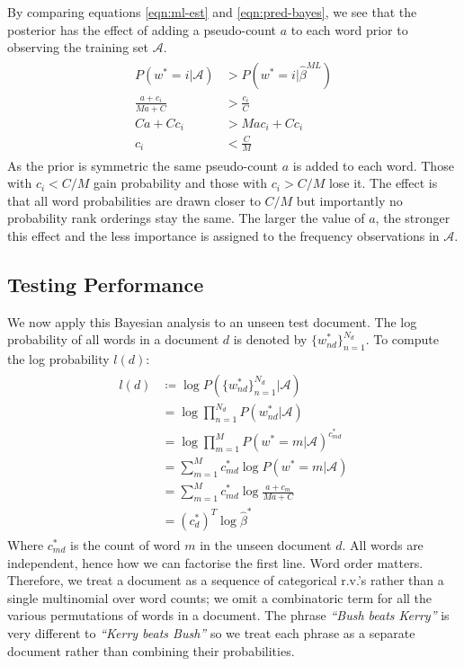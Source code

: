 \documentclass[]{article}
\newcommand{\Acal}{\mathcal{A}}
\newcommand{\betaml}{\hat{\beta}^{ML}}
\begin{document}
%
By comparing equations \ref{eqn:ml-est} and \ref{eqn:pred-bayes}, we see that the posterior has the effect of adding a pseudo-count $a$ to each word prior to observing the training set $\Acal$.
%
\begin{align}
\begin{split}
	P(w^*=i | \Acal) &> P(w^*=i | \betaml) \\
	\frac{a + c_i}{Ma + C} &> \frac{c_i}{C} \\
	Ca + Cc_i &> Mac_i + Cc_i \\
	c_i &< \frac{C}{M}
\end{split}
\end{align}
%
As the prior is symmetric the same pseudo-count $a$ is added to each word. Those with $c_i < C/M$ gain probability and those with $c_i > C/M$ lose it. The effect is that all word probabilities are drawn closer to $C/M$ but importantly no probability rank orderings stay the same. The larger the value of $a$, the stronger this effect and the less importance is assigned to the frequency observations in $\Acal$.

\subsection{Testing Performance}

We now apply this Bayesian analysis to an unseen test document. The log probability of all words in a document $d$ is denoted by $\{w^*_{nd}\}_{n=1}^{N_d}$. To compute the log probability $l(d)$:
%
\begin{align}
\begin{split}
	l(d) &\coloneqq \log P(\{w^*_{nd}\}_{n=1}^{N_d} | \Acal) \\
	&= \log \prod_{n=1}^{N_d} P(w^*_{nd} | \Acal) \\
	&= \log \prod_{m = 1}^{M} P(w^*=m | \Acal)^{c^*_{md}} \\
	&= \sum_{m=1}^{M} c^*_{md} \log P(w^* = m | \Acal) \\
	&= \sum_{m=1}^{M} c^*_{md} \log \frac{a+c_m}{Ma+C} \\
	&= (c^*_d)^T \log \hat{\beta}^{*}
\end{split}
\label{eqn:test-doc-prob}
\end{align}
%
Where $c^*_{md}$ is the count of word $m$ in the unseen document $d$. All words are independent, hence how we can factorise the first line. Word order matters. Therefore, we treat a document as a sequence of categorical r.v.'s rather than a single multinomial over word counts; we omit a combinatoric term for all the various permutations of words in a document. The phrase \textit{``Bush beats Kerry''} is very different to \textit{``Kerry beats Bush''} so we treat each phrase as a separate document rather than combining their probabilities.
\end{document}
